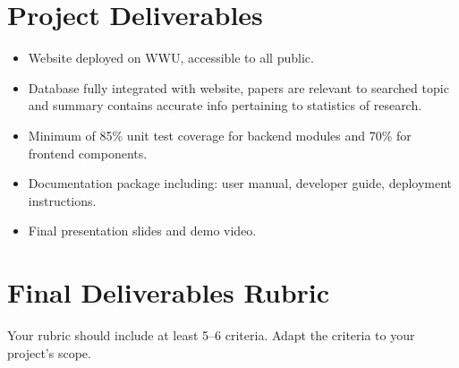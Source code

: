 \documentclass{article}
\begin{document}
\section*{Project Deliverables}
\begin{itemize}
    \item Website deployed on WWU, accessible to all public.
    \item Database fully integrated with website, papers are relevant to searched topic and summary contains accurate info pertaining to statistics of research.
    \item Minimum of 85\% unit test coverage for backend modules and 70\% for frontend components.  
    \item Documentation package including: user manual, developer guide, deployment instructions.  
    \item Final presentation slides and demo video.  
\end{itemize}



\section*{Final Deliverables Rubric}
Your rubric should include at least 5--6 criteria. Adapt the criteria to your project’s scope.  
\end{document}
